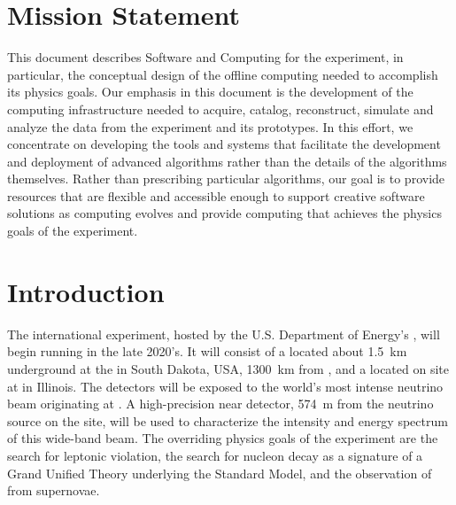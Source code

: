 \documentclass[../main-v1.tex]{subfiles}
\begin{document}
\section{Mission Statement}
This document describes Software and Computing for the  experiment, in particular, the conceptual design of the offline computing needed to accomplish its physics goals. Our emphasis in this document is the development of the computing infrastructure needed to acquire, catalog, reconstruct, simulate and analyze the data from the  experiment and its prototypes. In this effort, we concentrate on developing the tools and systems that facilitate the development and deployment of advanced algorithms rather than the details of the algorithms themselves. Rather than prescribing particular algorithms, our goal is to provide resources that are flexible and accessible enough to support creative software solutions as  computing evolves
and provide computing that achieves the physics goals of the  experiment. %

\section{Introduction }\label{sec:intro-introduction}

The international  experiment, hosted by the U.S. Department of Energy's ,  will begin running in the late 2020's. It will consist of a  located about \SI{1.5}{km} underground at the  in South Dakota, USA, \SI{1300}{\km} from , and a  located on site at  in Illinois. The  detectors will be exposed to the world's most intense neutrino beam originating at . A high-precision near detector, \SI{574}{m} from the neutrino source on the  site, will be used to characterize the intensity and energy spectrum of this wide-band beam. The overriding physics goals of the  experiment are the search for leptonic  violation, the search for nucleon decay as a signature of a Grand Unified Theory underlying the Standard Model, and the observation of   from supernovae.
\end{document}
